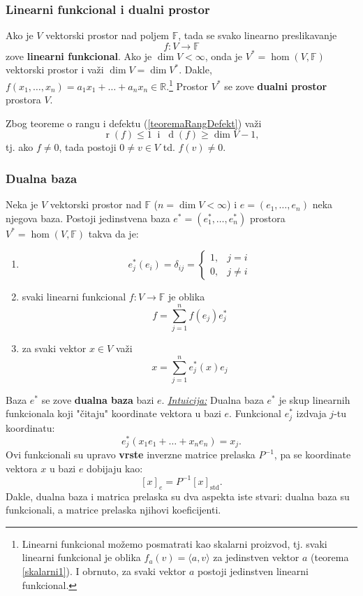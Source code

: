 \documentclass[a4paper,12pt,twoside]{report}
\numberwithin{algorithm}{section}
\begin{document}
\subsubsection*{Linearni funkcional i dualni prostor}
Ako je $V$ vektorski prostor nad poljem $\mathbb{F}$, tada se svako linearno preslikavanje \[f: V \to \mathbb{F}\] zove \textbf{linearni funkcional}. Ako je $\dim V < \infty$, onda je $V^* = \hom  (V, \mathbb{F})$ vektorski prostor i važi $\dim V = \dim V^*$. Dakle, $f(x_1, \dots, x_n) = a_1x_1 + \dots + a_nx_n  \in \mathbb{R}$.\;\footnote{Linearni funkcional možemo posmatrati kao skalarni proizvod, tj. svaki linearni funkcional je oblika $f_a(v) = \langle a, v \rangle$ za jedinstven vektor $a$ (teorema \ref{skalarni1}). I obrnuto, za svaki vektor $a$ postoji jedinstven linearni funkcional.} \linebreak Prostor $V^*$ se zove \textbf{dualni prostor} prostora $V$.


Zbog teoreme o rangu i defektu (\ref{teoremaRangDefekt}) važi \[ \operatorname{r} (f) \leq 1 \;\;\text{i}\;\; \operatorname{d}(f) \geq \dim V - 1,\] tj. ako $f \neq 0$, tada postoji $0 \neq v \in V$ td. $f(v) \neq 0$.
\\
\subsubsection{Dualna baza}
    Neka je $V$ vektorski prostor nad $\mathbb{F}$ ($n = \dim V < \infty$) i $e = (e_1, \dots, e_n)$ neka njegova baza.
     Postoji jedinstvena baza $e^* = (e_1^*, \dots, e_n^*)$ prostora $V^* = \hom  (V, \mathbb{F})$ takva da je:
    \begin{enumerate}
        \item \[
        e^*_j(e_i) = \delta_{ij}=\begin{cases}
            1, &j=i\\
            0, &j \neq i
        \end{cases}
    \]
    \item svaki linearni funkcional $f: V \to \mathbb{F}$ je oblika\[ f = \sum_{j=1}^{n} f(e_j)e_j^* \] 
    \item za svaki vektor $x \in V$ važi \[ x = \sum_{j=1}^{n} e^*_j(x)e_j \]
    \end{enumerate}
    Baza $e^*$ se zove \textbf{dualna baza} bazi $e$.
    \newpage
 \noindent\underline{\textit{Intuicija:}} 
Dualna baza $e^*$ je skup linearnih funkcionala koji "čitaju" koordinate vektora u bazi $e$. Funkcional $e_j^*$ izdvaja $j$-tu koordinatu:
\[
e_j^*(x_1e_1 + \dots + x_ne_n) = x_j.
\]
Ovi funkcionali su upravo \textbf{vrste} inverzne matrice prelaska $P^{-1}$, pa se koordinate vektora $x$ u bazi $e$ dobijaju kao:
\[
[x]_e = P^{-1} [x]_{\text{std}}.
\]
Dakle, dualna baza i matrica prelaska su dva aspekta iste stvari: dualna baza su funkcionali, a matrice prelaska njihovi koeficijenti.
\end{document}
